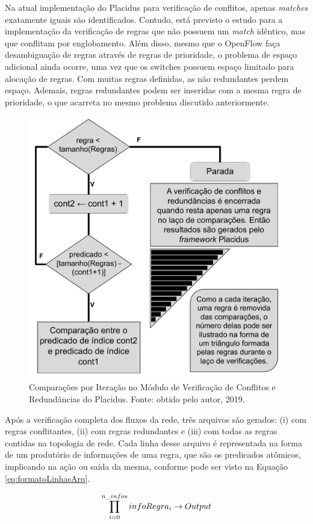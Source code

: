 \documentclass[12pt]{article}
\begin{document}
Na atual implementação do Placidus para verificação de conflitos, apenas \textit{matches} exatamente iguais são identificados. Contudo, está previsto o estudo para a implementação da verificação de regras que não possuem um \textit{match} idêntico, mas que conflitam por englobamento.
Além disso, mesmo que o OpenFlow faça desambiguação de regras através de regras de prioridade, o problema de espaço adicional ainda ocorre, uma vez que os switches possuem espaço limitado para alocação de regras.
Com muitas regras definidas, as não redundantes perdem espaço. Ademais, regras redundantes podem ser inseridas com a mesma regra de prioridade, o que acarreta no mesmo problema discutido anteriormente.

\begin{figure}[h!]
\centering\includegraphics[width=.6\columnwidth]{Resources/CompsPorIteracaoConfRedund.pdf}
\caption{Comparações por Iteração no Módulo de Verificação de Conflitos e Redundâncias do Placidus. Fonte: obtido pelo autor, 2019.}
\label{fig:compsIterConfRedund}
\end{figure}

Após a verificação completa dos fluxos da rede, três arquivos são gerados: (i) com regras conflitantes, (ii) com regras redundantes e (iii) com todas as regras contidas na topologia de rede.
Cada linha desse arquivo é representada na forma de um produtório de informações de uma regra, que são os predicados atômicos, implicando na ação ou saída da mesma, conforme pode ser visto na Equação \ref{eq:formatoLinhasArq}.

\begin{equation}
\label{eq:formatoLinhasArq}
\prod_{i = 0}^{n\char`_infos} infoRegra_{i} \rightarrow Output 
\end{equation}
\end{document}
